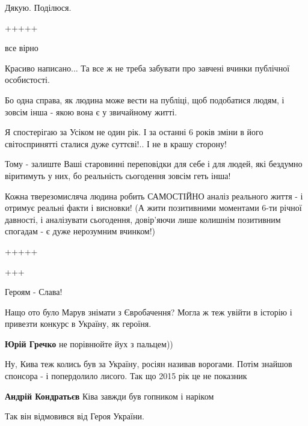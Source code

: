 \begin{itemize}
Дякую. Поділюся.

+++++

все вірно


Красиво написано... Та все ж не треба забувати про завчені вчинки публічної
особистості.

Бо одна справа, як людина може вести на публіці, щоб подобатися людям, і зовсім
інша - якою вона є у звичайному житті.

Я спостерігаю за Усіком не один рік. І за останні 6 років зміни в його
світоспринятті сталися дуже суттєві!.. І не в крашу сторону!

Тому - залиште Ваші старовинні переповідки для себе і для людей, які бездумно
віритимуть у них, бо реальність сьогодення зовсім геть інша!

Кожна тверезомисляча людина робить САМОСТІЙНО аналіз реального життя - і
отримує реальні факти і висновки! (А жити позитивними моментами 6-ти річної
давності, і аналізувати сьогодення, довір'яючи лише колишнім позитивним
спогадам - є дуже нерозумним вчинком!)

+++++

+++

Героям - Слава!

Нащо ото було Марув знімати з Євробачення? Могла ж теж увійти в історію і привезти конкурс в Україну, як героїня.

\begin{itemize} %
\textbf{Юрій Гречко} не порівнюйте йух з пальцем))
\end{itemize} %

Ну, Кива теж колись був за Україну, росіян називав ворогами. Потім знайшов спонсора - і попердолило лисого.
Так що 2015 рік це не показник

\begin{itemize} %
\textbf{Андрій Кондратьєв} Ківа завжди був гопником і наріком
\end{itemize} %

Так він відмовився від Героя України.



\end{itemize}
